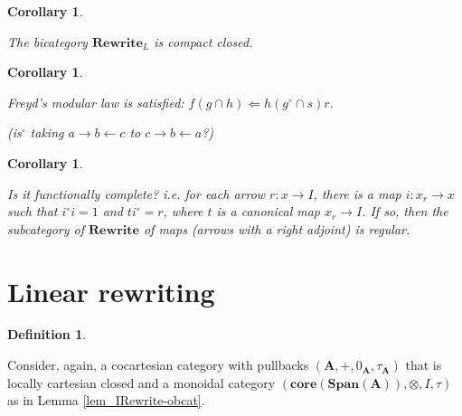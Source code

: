 \documentclass[]{amsart}
\newcommand{\A}{\cat{A}}
\newcommand{\core}{\mathbf{core}}
\newcommand{\cat}[1]{\mathbf{#1}}
\newcommand{\from}{\colon}
\newcommand{\Span}{\mathbf{Span}}
\newcommand{\Rewrite}{\mathbf{Rewrite} }
\newcommand{\edit}[1]{\textcolor{editcolour}{(#1)}}
\newtheorem{corollary}[theorem]{Corollary}
\theoremstyle{remark}
\theoremstyle{definition}
\newtheorem{definition}[theorem]{Definition}
\begin{document}
\begin{corollary} \label{thm:bit-rewr-comp-closed}
  
  The bicategory $ \Rewrite_L$ is compact closed.
  
\end{corollary}


\begin{corollary} \label{thm:bicat-rewr-freyds-modular}

  Freyd's modular law is satisfied:
  $ f (g \cap h) \Leftarrow h ( g^\circ \cap s ) r $.

  \edit{is$ ^\circ $ taking $ a \to b \gets c $ to
    $ c \to b\gets a $?}
  
\end{corollary} 


\begin{corollary} \label{thm:bicat-rewr-function-compl}

  Is it functionally complete? i.e. for each arrow
  $ r \from x \to I $, there is a map $ i \from x_r \to x $ such that
  $ i^\circ i = 1 $ and $ t i^\circ = r $, where $ t $ is a canonical
  map $ x_r \to I $. If so, then the subcategory of $ \Rewrite $ of
  maps (arrows with a right adjoint) is regular.
  
\end{corollary}


\section{Linear rewriting} \label{sec:linear-rewriting}


\begin{definition} \label{def:mon-rewrite-obcat}
 

  Consider, again, a cocartesian category with pullbacks
  $ (\A , + , 0_{\A} , \tau_\A ) $
  that is locally cartesian closed and a monoidal category
  $ ( \core ( \Span ( \A )) , \otimes , I , \tau )$
  as in Lemma \ref{lem_IRewrite-obcat}.
  
\end{definition}
\end{document}
